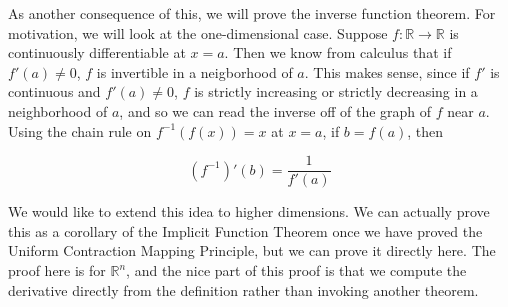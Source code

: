 \documentclass{article}
\def\R{{\mathbb R}}
\begin{document}
As another consequence of this, we will prove the inverse function theorem. For motivation, we will look at the one-dimensional case. Suppose $f: \R \rightarrow \R$ is continuously differentiable at $x = a$. Then we know from calculus that if $f'(a) \neq 0$, $f$ is invertible in a neigborhood of $a$. This makes sense, since if $f'$ is continuous and $f'(a) \neq 0$, $f$ is strictly increasing or strictly decreasing in a neighborhood of $a$, and so we can read the inverse off of the graph of $f$ near $a$. Using the chain rule on $f^{-1}(f(x)) = x$ at $x = a$, if $b = f(a)$, then

\[
(f^{-1})'(b) = \frac{1}{f'(a)}
\]

We would like to extend this idea to higher dimensions. We can actually prove this as a corollary of the Implicit Function Theorem once we have proved the Uniform Contraction Mapping Principle, but we can prove it directly here. The proof here is for $\R^n$, and the nice part of this proof is that we compute the derivative directly from the definition rather than invoking another theorem.
\\

\end{document}

